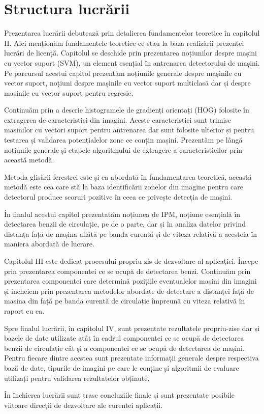 \section{Structura lucrării}

Prezentarea lucrării debutează prin detalierea fundamentelor teoretice în capitolul II. Aici menționăm fundamentele teoretice ce stau la baza realizării prezentei lucrări de licență. 
Capitolul se deschide prin prezentarea noțiunilor despre mașini cu vector suport (SVM), un element esențial în antrenarea detectorului de mașini. Pe parcursul acestui capitol prezentăm noțiunile generale despre mașinile cu vector suport, noțiuni despre mașinile cu vector suport multiclasă dar și despre mașinile cu vector suport pentru regresie.

Continuăm prin a descrie histogramele de gradienți orientați (HOG) folosite în extragerea de caracteristici din imagini. Aceste caracteristici sunt trimise mașinilor cu vectori suport pentru antrenarea dar sunt folosite ulterior și pentru testarea și validarea potențialelor zone ce conțin mașini. 
Prezentăm pe lângă noțiunile generale și etapele algoritmului de extragere a caracteristicilor prin această metodă. 

Metoda glisării ferestrei este și ea abordată în fundamentarea teoretică, această metodă este cea care stă la baza identificării zonelor din imagine pentru care detectorul produce scoruri pozitive în ceea ce privește detecția de mașini.

În finalul acestui capitol prezentatăm noțiunea de IPM, noțiune esențială în detectarea benzii de circulație, pe de o parte, dar și în analiza datelor privind distanța față de mașina aflătă pe banda curentă și de viteza relativă a acesteia în maniera abordată de lucrare.

Capitolul III este dedicat procesului propriu-zis de dezvoltare al aplicației. Începe prin prezentarea componentei ce se ocupă de detectarea benzi. Continuăm prin prezentarea componentei care determină pozițiile eventualelor mașini din imagini și incheiem prin prezentarea metodelor abordate de detectare a distanței față de mașina din față pe banda curentă de circulație împreună cu viteza relativă în raport cu ea.

Spre finalul lucrării, în capitolul IV, sunt prezentate rezultatele propriu-zise dar și bazele de date utilizate atât în cadrul componentei ce se ocupă de detectarea benzii de circulație cât și a componentei ce se ocupă de detectarea de mașini. Pentru fiecare dintre acestea sunt prezentate informații generale despre respectiva bază de date, tipurile de imagini pe care le conține și algoritmii de evaluare utilizați pentru validarea rezultatelor obținute.

În închierea lucrării sunt trase concluziile finale și sunt prezentate posibile viitoare direcții de dezvoltare ale curentei aplicații.